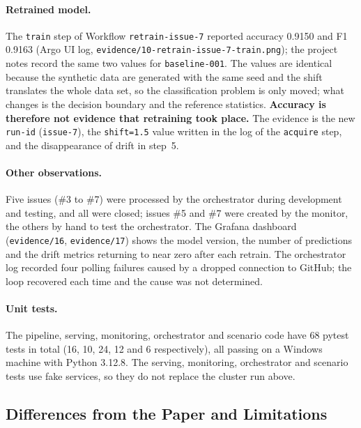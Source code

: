 \paragraph{Retrained model.} The \texttt{train} step of Workflow \texttt{retrain-issue-7} reported accuracy 0.9150 and F1 0.9163 (Argo UI log, \texttt{evidence/10-retrain-issue-7-train.png}); the project notes record the same two values for \texttt{baseline-001}. The values are identical because the synthetic data are generated with the same seed and the shift translates the whole data set, so the classification problem is only moved; what changes is the decision boundary and the reference statistics. \textbf{Accuracy is therefore not evidence that retraining took place.} The evidence is the new \texttt{run-id} (\texttt{issue-7}), the \texttt{shift=1.5} value written in the log of the \texttt{acquire} step, and the disappearance of drift in step~5.

\paragraph{Other observations.} Five issues (\#3 to \#7) were processed by the orchestrator during development and testing, and all were closed; issues \#5 and \#7 were created by the monitor, the others by hand to test the orchestrator. The Grafana dashboard (\texttt{evidence/16}, \texttt{evidence/17}) shows the model version, the number of predictions and the drift metrics returning to near zero after each retrain. The orchestrator log recorded four polling failures caused by a dropped connection to GitHub; the loop recovered each time and the cause was not determined.

\paragraph{Unit tests.} The pipeline, serving, monitoring, orchestrator and scenario code have 68 pytest tests in total (16, 10, 24, 12 and 6 respectively), all passing on a Windows machine with Python 3.12.8. The serving, monitoring, orchestrator and scenario tests use fake services, so they do not replace the cluster run above.

\subsection{Differences from the Paper and Limitations}

